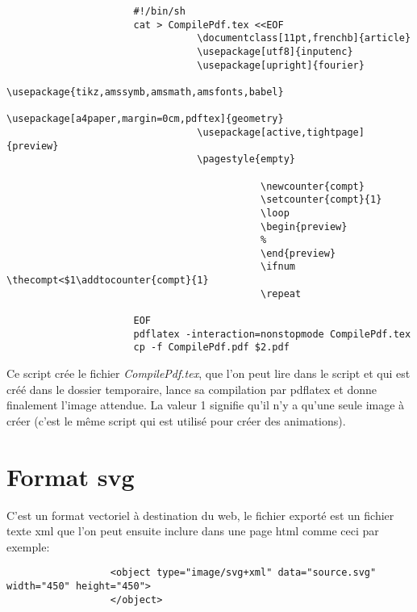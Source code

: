 \begin{verbatim}
                      #!/bin/sh
                      cat > CompilePdf.tex <<EOF
                                 \documentclass[11pt,frenchb]{article}
                                 \usepackage[utf8]{inputenc}
                                 \usepackage[upright]{fourier}
                                 \usepackage{tikz,amssymb,amsmath,amsfonts,babel}
                                 \usepackage[a4paper,margin=0cm,pdftex]{geometry}
                                 \usepackage[active,tightpage]{preview}
                                 \pagestyle{empty}
                                 
                                            \newcounter{compt}
                                            \setcounter{compt}{1}
                                            \loop
                                            \begin{preview}
                                            % 
                                            \end{preview}
                                            \ifnum \thecompt<$1\addtocounter{compt}{1}
                                            \repeat
                                 
                      EOF
                      pdflatex -interaction=nonstopmode CompilePdf.tex
                      cp -f CompilePdf.pdf $2.pdf
\end{verbatim}

Ce script crée le fichier \textit{CompilePdf.tex}, que l'on peut lire dans le script et qui est créé dans le dossier temporaire, lance sa compilation par pdflatex et donne finalement l'image attendue. La valeur 1 signifie qu'il n'y a qu'une seule image à créer (c'est le même script qui est utilisé pour créer des animations).

\section{Format svg}

C'est un format vectoriel à destination du web, le fichier exporté est un fichier texte xml que l'on peut ensuite inclure dans une page html comme ceci par exemple:

\begin{verbatim}
                  <object type="image/svg+xml" data="source.svg" width="450" height="450">
                  </object>
\end{verbatim}

